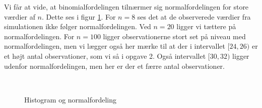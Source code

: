 {
Vi får at vide, at binomialfordelingen tilnærmer sig normalfordelingen
for store værdier af $n$. Dette ses i figur \ref{hist8_20_100}. For
$n = 8$ ses det at de observerede værdier fra simulationen ikke følger
normalfordelingen. Ved $n = 20$ ligger vi tættere på normalfordelingen.
For $n = 100$ ligger observationerne stort set på niveau med
normalfordelingen, men vi lægger også her mærke til at der i intervallet
$[24,26)$ er et højt antal observationer, som vi så i opgave 2. Også
intervallet $[30,32)$ ligger udenfor normalfordelingen, men her er der et
færre antal observationer.

\begin{figure}[!h]
    \centering
    \\
    \caption{Histogram og normalfordeling}
    \label{hist8_20_100}
\end{figure}

}
